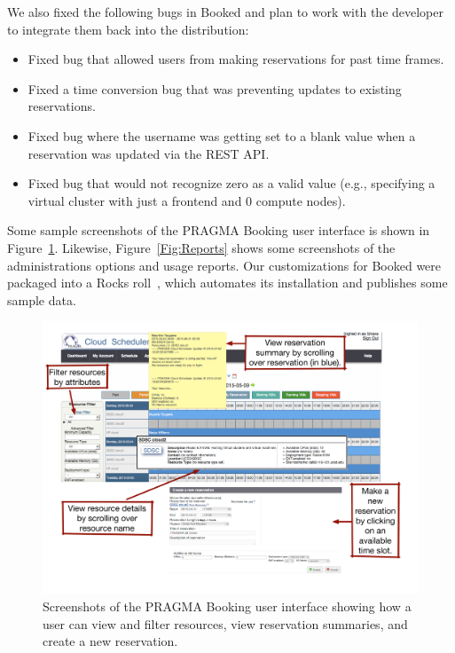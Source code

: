 \documentclass{acm_proc_article-sp}
\begin{document}
We also fixed the following bugs in Booked and plan to work with the developer to integrate them back into the distribution:

\begin{itemize}
\item Fixed bug that allowed users from making reservations for past time frames.
\item Fixed a time conversion bug that was preventing updates to existing reservations.
\item Fixed bug where the username was getting set to a blank value when a reservation was updated via the REST API. 
\item Fixed bug that would not recognize zero as a valid value (e.g., specifying a virtual cluster with just a frontend and 0 compute nodes).  
\end{itemize}

Some sample screenshots of the PRAGMA Booking user interface is shown in Figure~\ref{Fig:Booked}.  Likewise, Figure~\ref{Fig:Reports} shows some screenshots of the administrations options and usage reports.  Our customizations for Booked were packaged into a Rocks roll~\cite{cloudscheduler}, which automates its installation and publishes some sample data.

\begin{figure}[htbp]
\begin{center}
\includegraphics[width=\textwidth]{figures/bookedReservationScreenshot.pdf}
\caption{Screenshots of the PRAGMA Booking user interface showing how a user can view and filter resources, view reservation summaries, and create a new reservation.}
\label{Fig:Booked}
\end{center}
\end{figure}
\end{document}
